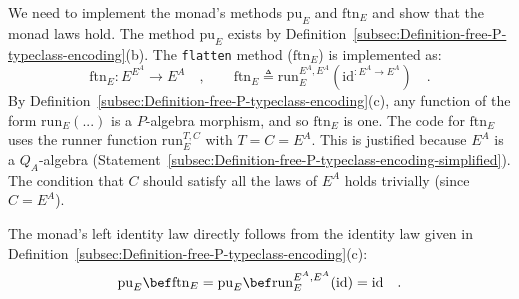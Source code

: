 We need to implement the monad\textsf{'}s methods $\text{pu}_{E}$ and $\text{ftn}_{E}$
and show that the monad laws hold. The method $\text{pu}_{E}$ exists
by Definition~\ref{subsec:Definition-free-P-typeclass-encoding}(b).
The \lstinline!flatten!
method ($\text{ftn}_{E}$) is implemented as:
\[
\text{ftn}_{E}:E^{E^{A}}\rightarrow E^{A}\quad,\quad\quad\text{ftn}_{E}\triangleq\text{run}_{E}^{E^{A},E^{A}}(\text{id}^{:E^{A}\rightarrow E^{A}})\quad.
\]
By Definition~\ref{subsec:Definition-free-P-typeclass-encoding}(c),
any function of the form $\text{run}_{E}(...)$ is a $P$-algebra
morphism, and so $\text{ftn}_{E}$ is one. The code for $\text{ftn}_{E}$
uses the runner function $\text{run}_{E}^{T,C}$ with $T=C=E^{A}$.
This is justified because $E^{A}$ is a $Q_{A}$-algebra (Statement~\ref{subsec:Definition-free-P-typeclass-encoding-simplified}).
The condition that $C$ should satisfy all the laws of $E^{A}$ holds
trivially (since $C=E^{A}$).

The monad\textsf{'}s left identity law directly follows from the identity law
given in Definition~\ref{subsec:Definition-free-P-typeclass-encoding}(c):
\[
\text{pu}_{E}\bef\text{ftn}_{E}=\text{pu}_{E}\bef\text{run}_{E}^{E^{A},E^{A}}(\text{id})=\text{id}\quad.
\]

